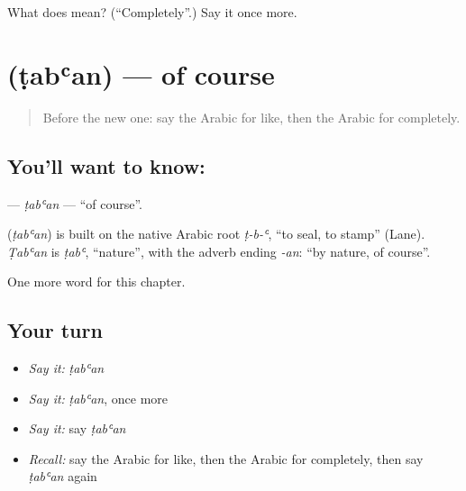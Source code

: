 \begin{tcolorbox}[breakable,colback=teal!4,colframe=teal!35!black,title={Before you move on}]
What does  mean? (\textquotedblleft{}Completely\textquotedblright{}.) Say it once more.
\end{tcolorbox}
\section[\texorpdfstring{\ar{طبعا} (ṭabʿan)}{طبعا (ṭabʿan)}]{ (ṭabʿan) — of course}

\label{lesson:AR-C238-taban}



\begin{quote}
Before the new one: say the Arabic for like, then the Arabic for completely.
\end{quote}

\subsection*{You'll want to know: }
\textbf{} — \emph{ṭabʿan} — \textquotedblleft{}of course\textquotedblright{}.

\begin{cousinweb}
\textbf{} (\emph{ṭabʿan}) is built on the native Arabic root \emph{ṭ-b-ʿ}, \textquotedblleft{}to seal, to stamp\textquotedblright{} (Lane). \emph{Ṭabʿan} is \emph{ṭabʿ}, \textquotedblleft{}nature\textquotedblright{}, with the adverb ending \emph{-an}: \textquotedblleft{}by nature, of course\textquotedblright{}.
\end{cousinweb}

\begin{grammarlens}[title={What you've built}]
One more word for this chapter.
\end{grammarlens}

\subsection*{Your turn}
\begin{itemize}
\raggedright
  \item \emph{Say it:} \emph{ṭabʿan}
  \item \emph{Say it:} \emph{ṭabʿan}, once more
  \item \emph{Say it:} say \emph{ṭabʿan}
  \item \emph{Recall:} say the Arabic for like, then the Arabic for completely, then say \emph{ṭabʿan} again
\end{itemize}

